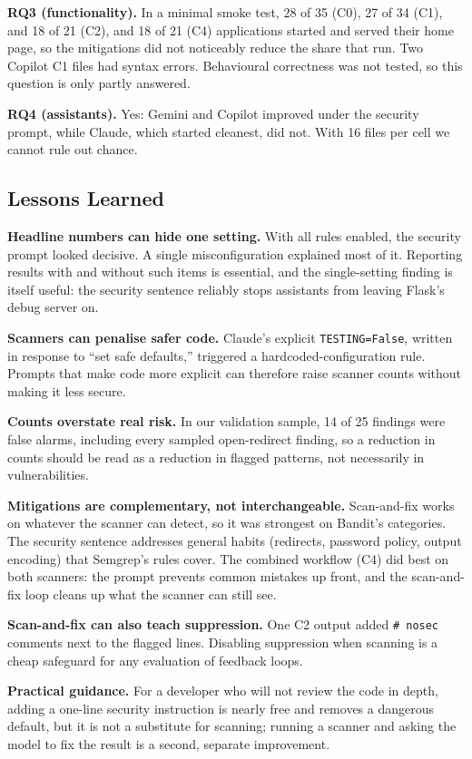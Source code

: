 \documentclass[conference]{IEEEtran}
\begin{document}
\textbf{RQ3 (functionality).} In a minimal smoke test, 28 of 35 (C0), 27 of 34 (C1), and 18 of 21 (C2), and 18 of 21 (C4) applications started and served their home page, so the mitigations did not noticeably reduce the share that run. Two Copilot C1 files had syntax errors. Behavioural correctness was not tested, so this question is only partly answered.

\textbf{RQ4 (assistants).} Yes: Gemini and Copilot improved under the security prompt, while Claude, which started cleanest, did not. With 16 files per cell we cannot rule out chance.

\subsection{Lessons Learned}
\textbf{Headline numbers can hide one setting.} With all rules enabled, the security prompt looked decisive. A single misconfiguration explained most of it. Reporting results with and without such items is essential, and the single-setting finding is itself useful: the security sentence reliably stops assistants from leaving Flask's debug server on.

\textbf{Scanners can penalise safer code.} Claude's explicit \texttt{TESTING=False}, written in response to ``set safe defaults,'' triggered a hardcoded-configuration rule. Prompts that make code more explicit can therefore raise scanner counts without making it less secure.

\textbf{Counts overstate real risk.} In our validation sample, 14 of 25 findings were false alarms, including every sampled open-redirect finding, so a reduction in counts should be read as a reduction in flagged patterns, not necessarily in vulnerabilities.

\textbf{Mitigations are complementary, not interchangeable.} Scan-and-fix works on whatever the scanner can detect, so it was strongest on Bandit's categories. The security sentence addresses general habits (redirects, password policy, output encoding) that Semgrep's rules cover. The combined workflow (C4) did best on both scanners: the prompt prevents common mistakes up front, and the scan-and-fix loop cleans up what the scanner can still see.

\textbf{Scan-and-fix can also teach suppression.} One C2 output added \texttt{\# nosec} comments next to the flagged lines. Disabling suppression when scanning is a cheap safeguard for any evaluation of feedback loops.

\textbf{Practical guidance.} For a developer who will not review the code in depth, adding a one-line security instruction is nearly free and removes a dangerous default, but it is not a substitute for scanning; running a scanner and asking the model to fix the result is a second, separate improvement.
\end{document}
